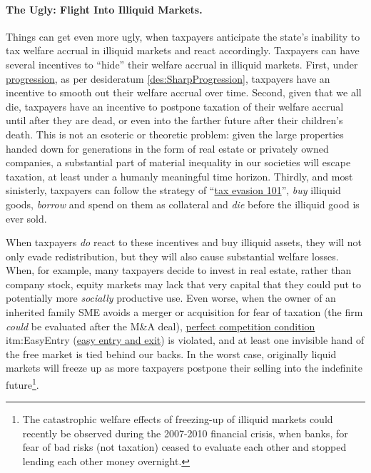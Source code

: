 \paragraph{The Ugly: Flight Into Illiquid Markets.}  \label{sec:FreezingUp} Things can get even more ugly, when taxpayers anticipate the state's inability to tax welfare accrual in illiquid markets and react accordingly. Taxpayers can have several incentives to ``hide'' their welfare accrual in illiquid markets. First, under \href{des:SharpProgression}{progression}, as per desideratum \ref{des:SharpProgression}, taxpayers have an incentive to smooth out their welfare accrual over time. Second, given that we all die, taxpayers have an incentive to postpone taxation of their welfare accrual until after they are dead, or even into the farther future after their children's death. This is not an esoteric or theoretic problem: given the large properties handed down for generations in the form of real estate or privately owned companies, a substantial part of material inequality in our societies will escape taxation, at least under a humanly meaningful time horizon. Thirdly, and most sinisterly, taxpayers can follow the strategy of ``\href{sec:Evasion101}{tax evasion 101}'', \emph{buy} illiquid goods, \emph{borrow} and spend on them as collateral and \emph{die} before the illiquid good is ever sold.

When taxpayers \emph{do} react to these incentives and buy illiquid assets, they will not only evade redistribution, but they will also cause substantial welfare losses. When, for example, many taxpayers decide to invest in real estate, rather than company stock, equity markets may lack that very capital that they could put to potentially more \emph{socially} productive use. Even worse, when the owner of an inherited family SME avoids a merger or acquisition for fear of taxation (the firm \emph{could} be evaluated after the M\&A deal), \href{sec:PerfectCompetition}{perfect competition condition} {itm:EasyEntry} (\hyperref[itm:EasyEntry]{easy entry and exit}) is violated, and at least one invisible hand of the free market is tied behind our backs. In the worst case, originally liquid markets will freeze up as more taxpayers postpone their selling into the indefinite future\footnote{The catastrophic welfare effects of freezing-up of illiquid markets could recently be observed during the 2007-2010 financial crisis, when banks, for fear of bad risks (not taxation) ceased to evaluate each other and stopped lending each other money overnight.}.

